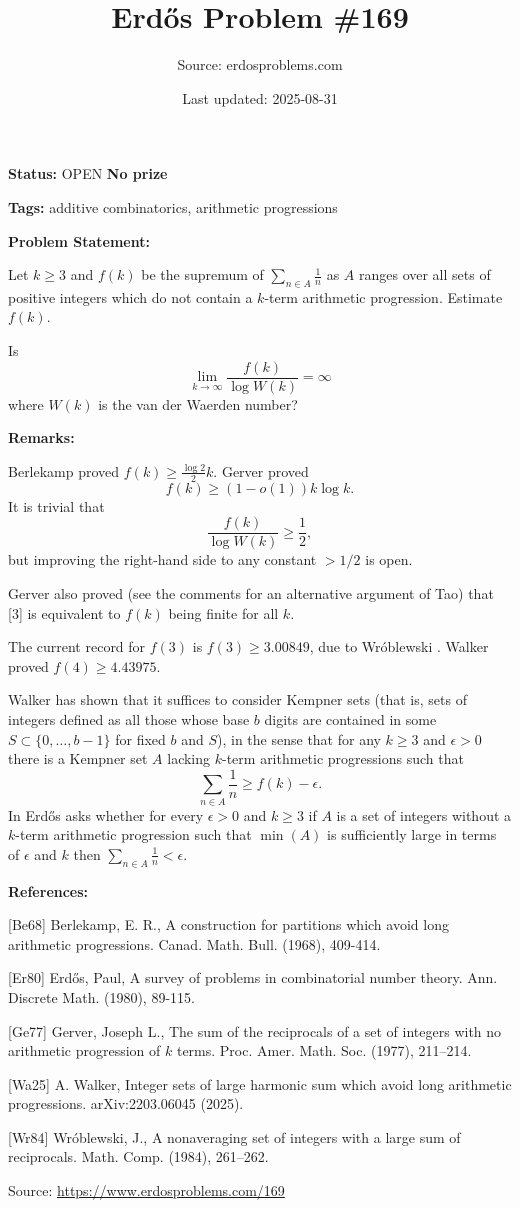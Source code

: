 \documentclass{article}
\title{Erd\H{o}s Problem \#169}
\date{Last updated: 2025-08-31}
\author{Source: erdosproblems.com}
\begin{document}
\maketitle

\noindent\textbf{Status:} OPEN \quad \textbf{No prize}

\noindent\textbf{Tags:} additive combinatorics, arithmetic progressions

\medskip
\noindent\textbf{Problem Statement:}

Let $k\geq 3$ and $f(k)$ be the supremum of $\sum_{n\in A}\frac{1}{n}$ as $A$ ranges over all sets of positive integers which do not contain a $k$-term arithmetic progression. Estimate $f(k)$. 

Is\[\lim_{k\to \infty}\frac{f(k)}{\log W(k)}=\infty\]where $W(k)$ is the van der Waerden number?

\bigskip
\noindent\textbf{Remarks:}

Berlekamp \cite{Be68} proved $f(k) \geq \frac{\log 2}{2}k$. Gerver \cite{Ge77} proved\[f(k) \geq (1-o(1))k\log k.\]It is trivial that\[\frac{f(k)}{\log W(k)}\geq \frac{1}{2},\]but improving the right-hand side to any constant $>1/2$ is open.

Gerver also proved (see the comments for an alternative argument of Tao) that [3] is equivalent to $f(k)$ being finite for all $k$.

The current record for $f(3)$ is $f(3)\geq 3.00849$, due to Wr\'{o}blewski \cite{Wr84}. Walker \cite{Wa25} proved $f(4)\geq 4.43975$.

Walker \cite{Wa25} has shown that it suffices to consider Kempner sets (that is, sets of integers defined as all those whose base $b$ digits are contained in some $S\subset \{0,\ldots,b-1\}$ for fixed $b$ and $S$), in the sense that for any $k\geq 3$ and $\epsilon>0$ there is a Kempner set $A$ lacking $k$-term arithmetic progressions such that\[\sum_{n\in A}\frac{1}{n}\geq f(k)-\epsilon.\]In \cite{Er80} Erd\H{o}s asks whether for every $\epsilon>0$ and $k\geq 3$ if $A$ is a set of integers without a $k$-term arithmetic progression such that $\min(A)$ is sufficiently large in terms of $\epsilon$ and $k$ then $\sum_{n\in A}\frac{1}{n}<\epsilon$.

\bigskip
\noindent\textbf{References:}

[Be68] Berlekamp, E. R., A construction for partitions which avoid long arithmetic progressions. Canad. Math. Bull. (1968), 409-414.
 
 [Er80] Erd\H{o}s, Paul, A survey of problems in combinatorial number theory. Ann. Discrete Math. (1980), 89-115.
 
 [Ge77] Gerver, Joseph L., The sum of the reciprocals of a set of integers with no
arithmetic progression of {$k$} terms. Proc. Amer. Math. Soc. (1977), 211--214.
 
 [Wa25] A. Walker, Integer sets of large harmonic sum which avoid long arithmetic progressions. arXiv:2203.06045 (2025).
 
 [Wr84] Wr\'oblewski, J., A nonaveraging set of integers with a large sum of reciprocals. Math. Comp. (1984), 261--262.

\bigskip
\noindent\small{Source: \url{https://www.erdosproblems.com/169}}
\end{document}
